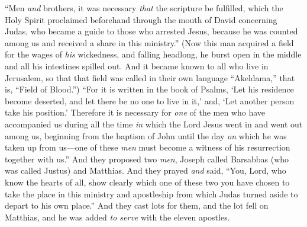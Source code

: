\begin{biblechapter}
\verse “Men \textit{and} brothers, it was necessary \textit{that} the scripture be fulfilled, which the Holy Spirit proclaimed beforehand through the mouth of David concerning Judas, who became a guide to those who arrested Jesus,
\verse because he was counted among us and received a share in this ministry.”
\verse (Now this man acquired a field for the wages of \textit{his} wickedness, and falling headlong, he burst open in the middle and all his intestines spilled out.
\verse And it became known to all who live in Jerusalem, so that that field was called in their own language “Akeldama,” that is, “Field of Blood.”)
\verse “For it is written in the book of Psalms, ‘Let his residence become deserted, 
and let there be no one to live in it,’ and, ‘Let another person take his position.’
\verse Therefore it is necessary for \textit{one} of the men who have accompanied us during all the time \textit{in} which the Lord Jesus went in and went out among us,
\verse beginning from the baptism of John until the day \textit{on} which he was taken up from us—one of these \textit{men} must become a witness of his resurrection together with us.”
\verse And they proposed two \textit{men}, Joseph called Barsabbas (who was called Justus) and Matthias.
\verse And they prayed \textit{and} said, “You, Lord, who know the hearts of all, show clearly which one of these two you have chosen
\verse to take the place in this ministry and apostleship from which Judas turned aside to depart to his own place.”
\verse And they cast lots for them, and the lot fell on Matthias, and he was added \textit{to serve} with the eleven apostles.
\end{biblechapter}

